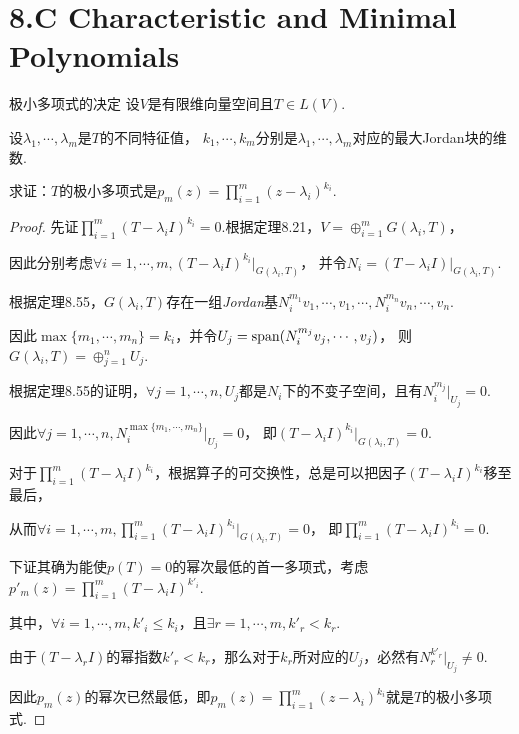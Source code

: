 \section{8.C Characteristic and Minimal Polynomials}

\begin{theorem}[8.46]\label{thm 8.46} 极小多项式的决定 \:
    设\(V\)是有限维向量空间且\(T \in L(V)\).

    设\(\lambda_1,\cdots,\lambda_m\)是\(T\)的不同特征值，
    \(k_1,\cdots,k_m\)分别是\(\lambda_1,\cdots,\lambda_m\)对应的最大Jordan块的维数.

    求证：\(T\)的极小多项式是\(p_m(z)=\prod_{i=1}^m (z-\lambda_i)^{k_i}\).
\end{theorem}

\begin{proof}
    先证\(\prod_{i=1}^m (T-\lambda_i I)^{k_i}=0\).根据定理8.21，\(V=\oplus_{i=1}^m G(\lambda_i,T)\)，

    因此分别考虑\(\forall i=1,\cdots,m,(T-\lambda_i I)^{k_i}|_{G(\lambda_i,T)}\)，
    并令\(N_i=(T-\lambda_i I)|_{G(\lambda_i,T)}\).
    
    根据定理8.55，\(G(\lambda_i,T)\)存在一组\textit{Jordan}基\(N_i^{m_1}v_1,\cdots,v_1,\cdots,N_i^{m_n}v_n,\cdots,v_n\).
    
    因此\(\max \{m_1,\cdots,m_n\}=k_i\)，并令\(U_j=\operatorname{span} (N_i^{m_j}v_j,\cdots,v_j)\)，
    则\(G(\lambda_i,T)=\oplus_{j=1}^n U_j\).
    
    根据定理8.55的证明，\(\forall j=1,\cdots,n,U_j\)都是\(N_i\)下的不变子空间，且有\(N_i^{m_j}|_{U_j}=0\).
    
    因此\(\forall j=1,\cdots,n,N_i^{\max \{m_1,\cdots,m_n\}}|_{U_j}=0\)，
    即\((T-\lambda_i I)^{k_i}|_{G(\lambda_i,T)}=0\).
    
    对于\(\prod_{i=1}^m (T-\lambda_i I)^{k_i}\)，根据算子的可交换性，总是可以把因子\((T-\lambda_i I)^{k_i}\)移至最后，
    
    从而\(\forall i=1,\cdots,m,\prod_{i=1}^m (T-\lambda_i I)^{k_i}|_{G(\lambda_i,T)}=0\)，
    即\(\prod_{i=1}^m (T-\lambda_i I)^{k_i}=0\).
    
    下证其确为能使\(p(T)=0\)的幂次最低的首一多项式，考虑\(p'_m(z)=\prod_{i=1}^m (T-\lambda_i I)^{k'_i}\).
    
    其中，\(\forall i=1,\cdots,m,k'_i \leq k_i\)，且\(\exists r=1,\cdots,m,k'_r<k_r\).
    
    由于\((T-\lambda_r I)\)的幂指数\(k'_r<k_r\)，那么对于\(k_r\)所对应的\(U_j\)，必然有\(N_r^{k'_r}|_{U_j} \ne 0\).
    
    因此\(p_m(z)\)的幂次已然最低，即\(p_m(z)=\prod_{i=1}^m (z-\lambda_i)^{k_i}\)就是\(T\)的极小多项式.
\end{proof}

